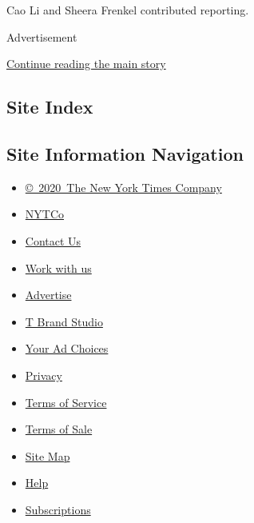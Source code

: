 Cao Li and Sheera Frenkel contributed reporting.

Advertisement

\protect\hyperlink{after-bottom}{Continue reading the main story}

\hypertarget{site-index}{%
\subsection{Site Index}\label{site-index}}

\hypertarget{site-information-navigation}{%
\subsection{Site Information
Navigation}\label{site-information-navigation}}

\begin{itemize}
\tightlist
\item
  \href{https://help.nytimes3xbfgragh.onion/hc/en-us/articles/115014792127-Copyright-notice}{©~2020~The
  New York Times Company}
\end{itemize}

\begin{itemize}
\tightlist
\item
  \href{https://www.nytco.com/}{NYTCo}
\item
  \href{https://help.nytimes3xbfgragh.onion/hc/en-us/articles/115015385887-Contact-Us}{Contact
  Us}
\item
  \href{https://www.nytco.com/careers/}{Work with us}
\item
  \href{https://nytmediakit.com/}{Advertise}
\item
  \href{http://www.tbrandstudio.com/}{T Brand Studio}
\item
  \href{https://www.nytimes3xbfgragh.onion/privacy/cookie-policy\#how-do-i-manage-trackers}{Your
  Ad Choices}
\item
  \href{https://www.nytimes3xbfgragh.onion/privacy}{Privacy}
\item
  \href{https://help.nytimes3xbfgragh.onion/hc/en-us/articles/115014893428-Terms-of-service}{Terms
  of Service}
\item
  \href{https://help.nytimes3xbfgragh.onion/hc/en-us/articles/115014893968-Terms-of-sale}{Terms
  of Sale}
\item
  \href{https://spiderbites.nytimes3xbfgragh.onion}{Site Map}
\item
  \href{https://help.nytimes3xbfgragh.onion/hc/en-us}{Help}
\item
  \href{https://www.nytimes3xbfgragh.onion/subscription?campaignId=37WXW}{Subscriptions}
\end{itemize}
